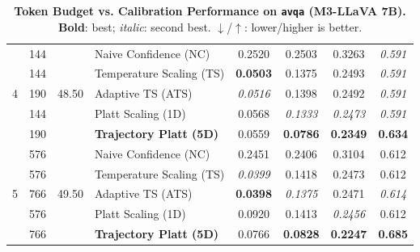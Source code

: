\begin{table}[t]
\begin{tabular}{ccclcccc}
\multirow{5}{*}{4} & 144 & \multirow{5}{*}{48.50} & Naive Confidence (NC) & 0.2520 & 0.2503 & 0.3263 & \textit{0.591} \\
 & 144 &  & Temperature Scaling (TS) & \textbf{0.0503} & 0.1375 & 0.2493 & \textit{0.591} \\
 & 190 &  & Adaptive TS (ATS) & \textit{0.0516} & 0.1398 & 0.2492 & \textit{0.591} \\
 & 144 &  & Platt Scaling (1D) & 0.0568 & \textit{0.1333} & \textit{0.2473} & \textit{0.591} \\
 & 190 &  & \textbf{Trajectory Platt (5D)} & 0.0559 & \textbf{0.0786} & \textbf{0.2349} & \textbf{0.634} \\
\midrule
\multirow{5}{*}{5} & 576 & \multirow{5}{*}{49.50} & Naive Confidence (NC) & 0.2451 & 0.2406 & 0.3104 & 0.612 \\
 & 576 &  & Temperature Scaling (TS) & \textit{0.0399} & 0.1418 & 0.2473 & 0.612 \\
 & 766 &  & Adaptive TS (ATS) & \textbf{0.0398} & \textit{0.1375} & 0.2471 & \textit{0.614} \\
 & 576 &  & Platt Scaling (1D) & 0.0920 & 0.1413 & \textit{0.2456} & 0.612 \\
 & 766 &  & \textbf{Trajectory Platt (5D)} & 0.0766 & \textbf{0.0828} & \textbf{0.2247} & \textbf{0.685} \\
\bottomrule
\end{tabular}
\caption{\textbf{Token Budget vs. Calibration Performance on \texttt{avqa} (M3-LLaVA 7B).} \textbf{Bold}: best; \textit{italic}: second best. $\downarrow$/$\uparrow$: lower/higher is better.}
\label{tab:token_budget_avqa_m3}
\end{table}

